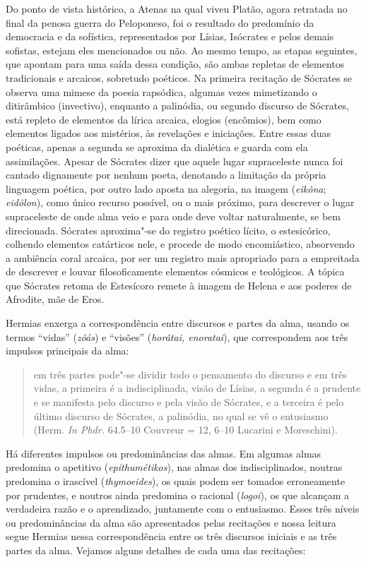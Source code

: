 Do ponto de vista histórico, a Atenas na qual viveu Platão, agora
retratada no final da penosa guerra do Peloponeso, foi o resultado do
predomínio da democracia e da sofística, representados por Lísias,
Isócrates e pelos demais sofistas, estejam eles mencionados ou não. Ao
mesmo tempo, as etapas seguintes, que apontam para uma saída dessa
condição, são ambas repletas de elementos tradicionais e arcaicos,
sobretudo poéticos. Na primeira recitação de Sócrates se observa uma
mimese da poesia rapsódica, algumas vezes mimetizando o ditirâmbico
(invectivo), enquanto a palinódia, ou segundo discurso de Sócrates, está
repleto de elementos da lírica arcaica, elogios (encômios), bem como
elementos ligados aos mistérios, às revelações e iniciações. Entre essas
duas poéticas, apenas a segunda se aproxima da dialética e guarda com
ela assimilações. Apesar de Sócrates dizer que aquele lugar supraceleste
nunca foi cantado dignamente por nenhum poeta, denotando a limitação da
própria linguagem poética, por outro lado aposta na alegoria, na imagem
(\emph{eikôna}; \emph{eidôlon}), como único recurso possível, ou o mais
próximo, para descrever o lugar supraceleste de onde alma veio e para
onde deve voltar naturalmente, se bem direcionada. Sócrates aproxima"-se
do registro poético lícito, o estesicórico, colhendo elementos
catárticos nele, e procede de modo encomiástico, absorvendo a ambiência
coral arcaica, por ser um registro mais apropriado para a empreitada de
descrever e louvar filosoficamente elementos cósmicos e teológicos. A tópica que Sócrates retoma de Estesícoro remete à imagem de Helena e aos
poderes de Afrodite, mãe de Eros.

Hermias enxerga a correspondência entre discursos e partes da alma,
usando os termos ``vidas'' (\emph{zôás}) e ``visões'' (\emph{horâtai,
enoratai}), que correspondem aos três impulsos principais da alma:

 

\begin{quote}
em três partes pode"-se dividir todo o pensamento do discurso e em três
vidas, a primeira é a indisciplinada, visão de Lísias, a segunda é a
prudente e se manifesta pelo discurso e pela visão de Sócrates, e a
terceira é pelo último discurso de Sócrates, a palinódia, no qual se vê
o entusiasmo (Herm. \emph{In Phdr.} 64.5--10 Couvreur = 12, 6--10
Lucarini e Moreschini).
\end{quote}

 

Há diferentes impulsos ou predominâncias das almas. Em algumas almas
predomina o apetitivo (\emph{epithumétikos}), nas almas dos
indisciplinados, noutras predomina o irascível (\emph{thymoeides}), os
quais podem ser tomados erroneamente por prudentes, e noutros ainda
predomina o racional (\emph{logoi}), os que alcançam a verdadeira razão
e o aprendizado, juntamente com o entusiasmo. Esses três níveis ou
predominâncias da alma são apresentados pelas recitações e nossa leitura
segue Hermias nessa correspondência entre os três discursos iniciais e
as três partes da alma. Vejamos alguns detalhes de cada uma das
recitações:



